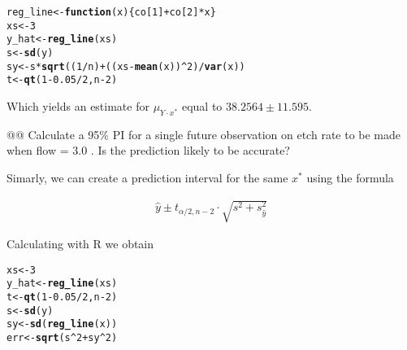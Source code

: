 \documentclass[10pt]{article}\usepackage[]{graphicx}\usepackage[]{xcolor}
\makeatletter
\newcommand{\hlnum}[1]{\textcolor[rgb]{0.686,0.059,0.569}{#1}}%
\newcommand{\hlopt}[1]{\textcolor[rgb]{0,0,0}{#1}}%
\newcommand{\hlstd}[1]{\textcolor[rgb]{0.345,0.345,0.345}{#1}}%
\newcommand{\hlkwa}[1]{\textcolor[rgb]{0.161,0.373,0.58}{\textbf{#1}}}%
\newcommand{\hlkwb}[1]{\textcolor[rgb]{0.69,0.353,0.396}{#1}}%
\newcommand{\hlkwc}[1]{\textcolor[rgb]{0.333,0.667,0.333}{#1}}%
\newcommand{\hlkwd}[1]{\textcolor[rgb]{0.737,0.353,0.396}{\textbf{#1}}}%
\newenvironment{kframe}{%
 \def\at@end@of@kframe{}%
 \ifinner\ifhmode%
  \def\at@end@of@kframe{\end{minipage}}%
  \begin{minipage}{\columnwidth}%
 \fi\fi%
 \def\FrameCommand##1{\hskip\@totalleftmargin \hskip-\fboxsep
 \colorbox{shadecolor}{##1}\hskip-\fboxsep
     \hskip-\linewidth \hskip-\@totalleftmargin \hskip\columnwidth}%
 \MakeFramed {\advance\hsize-\width
   \@totalleftmargin\z@ \linewidth\hsize
   \@setminipage}}%
 {\par\unskip\endMakeFramed%
 \at@end@of@kframe}
\newenvironment{knitrout}{}{} %
\makeatother
\begin{document}
\begin{easylist}[enumerate]
\begin{knitrout}
\color{fgcolor}\begin{kframe}
\begin{alltt}
         \hlstd{reg_line} \hlkwb{<-} \hlkwa{function}\hlstd{(}\hlkwc{x}\hlstd{) \{ co[}\hlnum{1}\hlstd{]} \hlopt{+} \hlstd{co[}\hlnum{2}\hlstd{]} \hlopt{*} \hlstd{x \}}
         \hlstd{xs} \hlkwb{<-} \hlnum{3}
         \hlstd{y_hat} \hlkwb{<-} \hlkwd{reg_line}\hlstd{(xs)}
         \hlstd{s} \hlkwb{<-} \hlkwd{sd}\hlstd{(y)}
         \hlstd{sy} \hlkwb{<-} \hlstd{s} \hlopt{*} \hlkwd{sqrt}\hlstd{((}\hlnum{1}\hlopt{/}\hlstd{n)} \hlopt{+} \hlstd{((xs} \hlopt{-} \hlkwd{mean}\hlstd{(x))}\hlopt{^}\hlnum{2}\hlstd{)}\hlopt{/}\hlkwd{var}\hlstd{(x))}
         \hlstd{t} \hlkwb{<-} \hlkwd{qt}\hlstd{(}\hlnum{1} \hlopt{-} \hlnum{0.05} \hlopt{/} \hlnum{2}\hlstd{, n} \hlopt{-} \hlnum{2}\hlstd{)}
\end{alltt}
\end{kframe}
\end{knitrout}


    Which yields an estimate for $\mu_{Y\cdot x^*}$ equal to $38.2564 \pm 11.595$.

    @@ Calculate a 95\% PI for a single future observation on etch rate to be made when flow = 3.0 . Is the prediction
    likely to be accurate?\newline

    Simarly, we can create a prediction interval for the same $x^*$ using the formula

    \begin{equation}
        \begin{aligned}
            \hat{y} \pm t_{\alpha / 2, n - 2} \cdot \sqrt{s^2 + s^2_{\hat{y}}}
        \end{aligned}
    \end{equation}

    Calculating with R we obtain

\begin{knitrout}
\color{fgcolor}\begin{kframe}
\begin{alltt}
         \hlstd{xs} \hlkwb{<-} \hlnum{3}
         \hlstd{y_hat} \hlkwb{<-} \hlkwd{reg_line}\hlstd{(xs)}
         \hlstd{t} \hlkwb{<-} \hlkwd{qt}\hlstd{(}\hlnum{1} \hlopt{-} \hlnum{0.05} \hlopt{/} \hlnum{2}\hlstd{, n} \hlopt{-} \hlnum{2}\hlstd{)}
         \hlstd{s} \hlkwb{<-} \hlkwd{sd}\hlstd{(y)}
         \hlstd{sy} \hlkwb{<-} \hlkwd{sd}\hlstd{(}\hlkwd{reg_line}\hlstd{(x))}
         \hlstd{err} \hlkwb{<-} \hlkwd{sqrt}\hlstd{(s}\hlopt{^}\hlnum{2} \hlopt{+} \hlstd{sy}\hlopt{^}\hlnum{2}\hlstd{)}
\end{alltt}
\end{kframe}
\end{knitrout}



\end{easylist}
\end{document}

